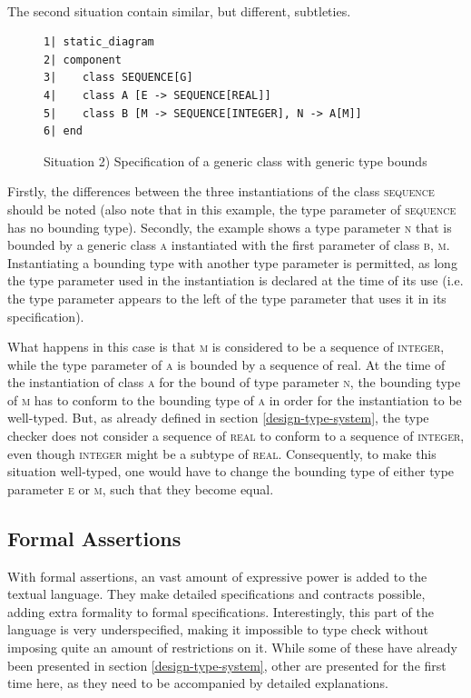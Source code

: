 \paragraph{} The second situation contain similar, but different, subtleties.
\begin{figure}[H]
{\footnotesize
\begin{verbatim}
1| static_diagram
2| component
3|    class SEQUENCE[G]
4|    class A [E -> SEQUENCE[REAL]]
5|    class B [M -> SEQUENCE[INTEGER], N -> A[M]] 
6| end
\end{verbatim}
}
\caption{Situation 2) Specification of a generic class with generic type bounds}
\label{fig:generic_type_bounds}
\end{figure}
Firstly, the differences between the three instantiations of the class \textsc{sequence} should be noted (also note that in this example, the type parameter of \textsc{sequence} has no bounding type). Secondly, the example shows a type parameter \textsc{n} that is bounded by a generic class \textsc{a} instantiated with the first parameter of class \textsc{b},  \textsc{m}. Instantiating a bounding type with another type parameter is permitted, as long the type parameter used in the instantiation is declared at the time of its use (i.e. the type parameter appears to the left of the type parameter that uses it in its specification).

What happens in this case is that \textsc{m} is considered to be a sequence of \textsc{integer}, while the type parameter of \textsc{a} is bounded by a sequence of {real}. At the time of the instantiation of class \textsc{a} for the bound of type parameter \textsc{n}, the bounding type of \textsc{m} has to conform to the bounding type of \textsc{a} in order for the instantiation to be well-typed. But, as already defined in section \ref{design-type-system}, the type checker does not consider a sequence of \textsc{real} to conform to a sequence of \textsc{integer}, even though \textsc{integer} might be a subtype of \textsc{real}. Consequently, to make this situation well-typed, one would have to change the bounding type of either type parameter \textsc{e} or \textsc{m}, such that they become equal.

\subsection{Formal Assertions}
With formal assertions, an vast amount of expressive power is added to the textual \bon{} language. They make detailed specifications and contracts possible, adding extra formality to formal specifications. Interestingly, this part of the language is very underspecified, making it impossible to type check without imposing quite an amount of restrictions on it. While some of these have already been presented in section \ref{design-type-system}, other are presented for the first time here, as they need to be accompanied by detailed explanations.
\label{implementation-formal-assertions}
